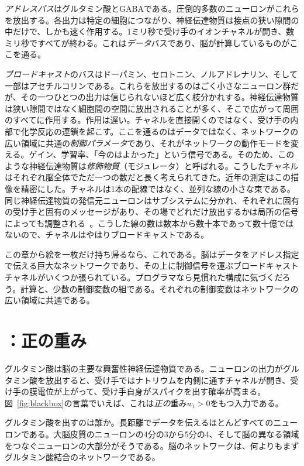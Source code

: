 \emph{アドレスバス}はグルタミン酸とGABAである。圧倒的多数のニューロンがこれらを放出する。各出力は特定の細胞につながり、神経伝達物質は接点の狭い隙間の中だけで、しかも速く作用する。1ミリ秒で受け手のイオンチャネルが開き、数ミリ秒ですべてが終わる。これは\emph{データ}バスであり、脳が計算しているものがここを通る。

\emph{ブロードキャスト}のバスはドーパミン、セロトニン、ノルアドレナリン、そして一部はアセチルコリンである。これらを放出するのはごく小さなニューロン群だが、その一つひとつの出力は信じられないほど広く枝分かれする。神経伝達物質は狭い隙間ではなく細胞間の空間に放出されることが多く、そこで広がって周囲のすべてに作用する。作用は遅い。チャネルを直接開くのではなく、受け手の内部で化学反応の連鎖を起こす。ここを通るのはデータではなく、ネットワークの広い領域に共通の\emph{制御パラメータ}であり、それがネットワークの動作モードを変える。ゲイン、学習率、「今のはよかった」という信号である。そのため、このような神経伝達物質は\emph{修飾物質}（モジュレータ）と呼ばれる。こうしたチャネルはそれぞれ脳全体でただ一つの数だと長く考えられてきた。近年の測定はこの描像を精密にした。チャネルは1本の配線ではなく、並列な線の小さな束である。同じ神経伝達物質の発信元ニューロンはサブシステムに分かれ、それぞれに固有の受け手と固有のメッセージがあり、その場でどれだけ放出するかは局所の信号によっても調整される~\cite{Ren2018,Poe2020}。こうした線の数は数本から数十本であって数十億ではないので、チャネルはやはりブロードキャストである。

この章から絵を一枚だけ持ち帰るなら、これである。脳はデータをアドレス指定で伝える巨大なネットワークであり、その上に制御信号を運ぶブロードキャストチャネルがいくつか張られている。プログラマなら見慣れた構成に気づくだろう。計算と、少数の制御変数の組である。それぞれの制御変数はネットワークの広い領域に共通である。

\section{：正の重み}

グルタミン酸は脳の主要な興奮性神経伝達物質である。ニューロンの出力がグルタミン酸を放出すると、受け手ではナトリウムを内側に通すチャネルが開き、受け手の膜電位が上がって、受け手自身がスパイクを出す確率が高まる。図~\ref{fig:blackbox}の言葉でいえば、これは\emph{正の}重み$w_i>0$をもつ入力である。

グルタミン酸を出すのは誰か。長距離でデータを伝えるほとんどすべてのニューロンである。大脳皮質のニューロンの4分の3から5分の4、そして脳の異なる領域をつなぐニューロンの大部分がそうである。脳のネットワークは、何よりもまずグルタミン酸結合のネットワークである。

